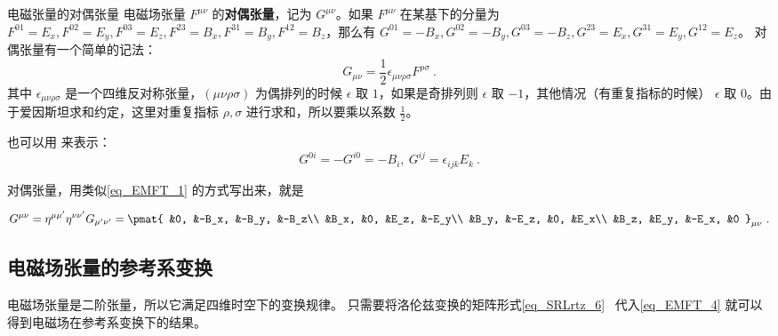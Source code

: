 \begin{definition}{电磁张量的对偶张量}
电磁场张量 $F^{\mu\nu}$ 的\textbf{对偶张量}，记为 $G^{\mu\nu}$。如果 $F^{\mu\nu}$ 在某基下的分量为 $F^{01}=E_x, F^{02}=E_y, F^{03}=E_z, F^{23}=B_x, F^{31}=B_y, F^{12}=B_z$，那么有 $G^{01}=-B_x, G^{02}=-B_y, G^{03}=-B_z, G^{23}=E_x, G^{31}=E_y, G^{12}=E_z$。
对偶张量有一个简单的记法：
\begin{equation}
G_{\mu\nu}=\frac{1}{2}\epsilon_{\mu\nu\rho\sigma}F^{\rho\sigma}~.
\end{equation}
其中 $\epsilon_{\mu\nu\rho\sigma}$ 是一个四维反对称张量，$(\mu\nu\rho\sigma)$ 为偶排列的时候 $\epsilon$ 取 $1$，如果是奇排列则 $\epsilon$ 取 $-1$，其他情况（有重复指标的时候） $\epsilon$ 取 $0$。由于爱因斯坦求和约定，这里对重复指标 $\rho,\sigma$ 进行求和，所以要乘以系数 $\frac{1}{2}$。

也可以用 来表示：
\begin{equation}
G^{0i}=-G^{i0}=-B_i,\ G^{ij}=\epsilon_{ijk}E_k~.
\end{equation}
\end{definition}

对偶张量，用类似\autoref{eq_EMFT_1} 的方式写出来，就是

\begin{equation}
\begin{aligned}
G^{\mu\nu}=\eta^{\mu\mu'}\eta^{\nu\nu'}G_{\mu'\nu'}=
\pmat{
&0, &-B_x, &-B_y, &-B_z\\ 
&B_x, &0, &E_z, &-E_y\\ 
&B_y, &-E_z, &0, &E_x\\
&B_z, &E_y, &-E_x, &0
}_{\mu\nu}~.
\end{aligned}
\end{equation}

\subsection{电磁场张量的参考系变换}
电磁场张量是二阶张量，所以它满足四维时空下的变换规律。
只需要将洛伦兹变换的矩阵形式\autoref{eq_SRLrtz_6}~ 代入\autoref{eq_EMFT_4} 就可以得到电磁场在参考系变换下的结果。

